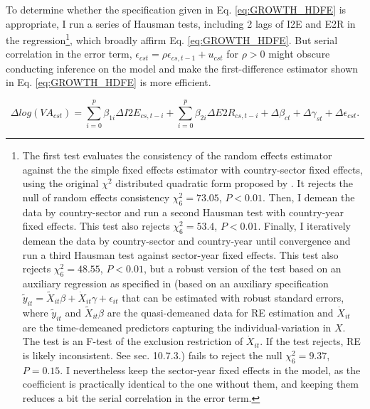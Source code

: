 \documentclass[a4paper]{article}
\begin{document}
 To determine whether the specification given in Eq. \ref{eq:GROWTH_HDFE} is appropriate, I run a series of Hausman tests, including 2 lags of I2E and E2R in the regression\footnote{The first test evaluates the consistency of the random effects estimator against the the  simple fixed effects estimator with country-sector fixed effects, using the original $\chi^2$ distributed quadratic form proposed by \citet{hausman1978specification}. It rejects the null of random effects consistency $\chi^2_6 = 73.05$, $P < 0.01$. Then, I demean the data by country-sector and run a second Hausman test with country-year fixed effects. This test also rejects $\chi^2_6 = 53.4$, $P < 0.01$. Finally, I iteratively demean the data by country-sector and country-year until convergence and run a third Hausman test against sector-year fixed effects. This test also rejects $\chi^2_6 = 48.55$, $P < 0.01$, but a robust version of the test based on an auxiliary regression as specified in \citet{wooldridge2010econometric} (based on an auxiliary specification $\tilde{y}_{it} = \tilde{X}_{it}\beta + \dot{X}_{it}\gamma + \epsilon_{it}$ that can be estimated with robust standard errors, where  $\tilde{y}_{it} $ and $\tilde{X}_{it}\beta$ are the quasi-demeaned data for RE estimation and $\dot{X}_{it}$ are the time-demeaned predictors capturing the individual-variation in $X$. The test is an F-test of the exclusion restriction of $\dot{X}_{it}$. If the test rejects, RE is likely inconsistent. See \citet{wooldridge2010econometric} sec. 10.7.3.) fails to reject the null $\chi^2_6 = 9.37$, $P = 0.15$. I nevertheless keep the sector-year fixed effects in the model, as the coefficient is practically identical to the one without them, and keeping them reduces a bit the serial correlation in the error term.}, which broadly affirm Eq. \ref{eq:GROWTH_HDFE}. But serial correlation in the error term, $\epsilon_{cst} = \rho \epsilon_{cs,t-1} + u_{cst}$ for $\rho > 0$ might obscure conducting inference on the model and make the first-difference estimator shown in Eq. \ref{eq:GROWTH_HDFE} is more efficient. 

 

\begin{equation} \label{eq:GROWTH_HDFE}
\Delta log(VA_{cst}) = \sum_{i=0}^p \beta_{1i} \Delta I2E_{cs,t-i} + \sum_{i = 0}^p \beta_{2i} \Delta E2R_{cs,t-i}  + \Delta\beta_{ct} + \Delta\gamma_{st} + \Delta\epsilon_{cst}.
\end{equation}
\end{document}

